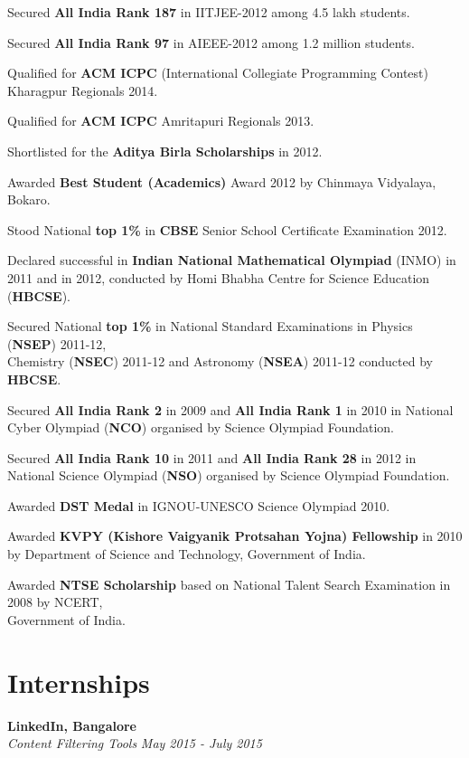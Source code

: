 \documentclass[margin,10pt]{resume}
\begin{document}
\begin{resume}
\begin{list2}
\begin{spacing}{1.4}
\item Secured \textbf{All India Rank 187} in IITJEE-2012 among 4.5 lakh students.
\item Secured \textbf{All India Rank 97} in AIEEE-2012 among 1.2 million students.
\item Qualified for \textbf{ACM ICPC} (International Collegiate Programming Contest) \mbox{Kharagpur} Regionals 2014.
\item Qualified for \textbf{ACM ICPC} \mbox{Amritapuri} Regionals 2013.
\item Shortlisted for the \textbf{Aditya Birla Scholarships} in 2012.
\item Awarded \textbf{Best Student (Academics)} Award 2012 by Chinmaya Vidyalaya, Bokaro.
\item Stood National \textbf{top 1\%} in \textbf{CBSE} Senior School Certificate Examination 2012.
\item Declared successful in \textbf{Indian National Mathematical Olympiad} (INMO) in 2011 and in 2012, conducted by Homi Bhabha Centre for Science Education (\textbf{HBCSE}).
\item Secured National \textbf{top 1\%} in National Standard Examinations in
Physics (\textbf {NSEP}) \mbox{2011-12,} \\Chemistry (\textbf {NSEC}) 2011-12 and Astronomy (\textbf{NSEA}) 2011-12 conducted by \textbf{HBCSE}.
\item Secured \textbf{All India Rank 2} in 2009 and \textbf{All India Rank 1} in 2010 in National Cyber Olympiad (\textbf{NCO}) organised by Science Olympiad \mbox{Foundation.}
\item Secured \textbf{All India Rank 10} in 2011 and \textbf{All India Rank 28} in 2012 in National Science Olympiad (\textbf{NSO}) organised by Science Olympiad Foundation.
\item Awarded \textbf{DST Medal} in IGNOU-UNESCO Science Olympiad 2010.
\item Awarded \textbf{KVPY (Kishore Vaigyanik Protsahan Yojna) Fellowship} in 2010
by Department of Science and Technology, Government of India.
\item Awarded \textbf{NTSE Scholarship} based on National Talent Search Examination in 2008 by NCERT,\\ Government of India.
\end{spacing}
\end{list2}
\vspace{-7mm}
\section{\mysidestyle Internships}
\begin{list2}
\item \textbf{LinkedIn, Bangalore}\\
\textsl{Content Filtering Tools} \hfill \emph{May 2015 - July 2015}


\end{list2}
\end{resume}
\end{document}
